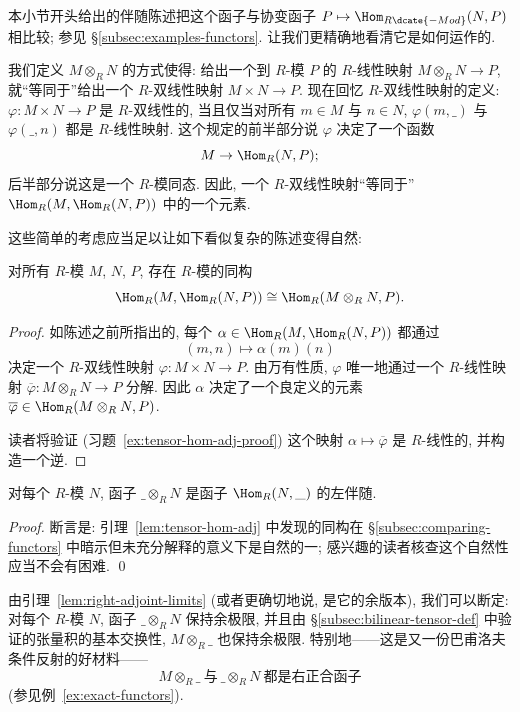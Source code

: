 本小节开头给出的伴随陈述把这个函子与协变函子 $P\mapsto\Hom_{R\dcate{-Mod}}(N,P)$ 相比较; 参见 §\ref{subsec:examples-functors}. 让我们更精确地看清它是如何运作的.

我们定义 $M\otimes_R N$ 的方式使得: 给出一个到 $R$-模 $P$ 的 $R$-线性映射 $M\otimes_R N\to P$, 就``等同于''给出一个 $R$-双线性映射 $M\times N\to P$. 现在回忆 $R$-双线性映射的定义: $\varphi:M\times N\to P$ 是 $R$-双线性的, 当且仅当对所有 $m\in M$ 与 $n\in N$, $\varphi(m,\_)$ 与 $\varphi(\_,n)$ 都是 $R$-线性映射. 这个规定的前半部分说 $\varphi$ 决定了一个函数
\[
M\to\Hom_R(N,P);
\]
后半部分说这是一个 $R$-模同态. 因此, 一个 $R$-双线性映射``等同于''$\Hom_R(M,\Hom_R(N,P))$ 中的一个元素.

这些简单的考虑应当足以让如下看似复杂的陈述变得自然:

\begin{lemma}\label{lem:tensor-hom-adj}
对所有 $R$-模 $M$, $N$, $P$, 存在 $R$-模的同构
\[
\Hom_R(M,\Hom_R(N,P))\cong\Hom_R(M\otimes_R N,P).
\]
\end{lemma}

\begin{proof}
如陈述之前所指出的, 每个 $\alpha\in\Hom_R(M,\Hom_R(N,P))$ 都通过
\[
(m,n)\mapsto\alpha(m)(n)
\]
决定一个 $R$-双线性映射 $\varphi:M\times N\to P$. 由万有性质, $\varphi$ 唯一地通过一个 $R$-线性映射 $\overline{\varphi}:M\otimes_R N\to P$ 分解. 因此 $\alpha$ 决定了一个良定义的元素 $\overline{\varphi}\in\Hom_R(M\otimes_R N,P)$.

读者将验证 (习题~\ref{ex:tensor-hom-adj-proof}) 这个映射 $\alpha\mapsto\overline{\varphi}$ 是 $R$-线性的, 并构造一个逆.
\end{proof}

\begin{corollary}\label{cor:tensor-left-adjoint}
对每个 $R$-模 $N$, 函子 $\_\otimes_R N$ 是函子 $\Hom_R(N,\_)$ 的左伴随.
\end{corollary}

\begin{proof}
断言是: 引理~\ref{lem:tensor-hom-adj} 中发现的同构在 §\ref{subsec:comparing-functors} 中暗示但未充分解释的意义下是自然的一; 感兴趣的读者核查这个自然性应当不会有困难. \qed
\end{proof}

由引理~\ref{lem:right-adjoint-limits} (或者更确切地说, 是它的余版本), 我们可以断定: 对每个 $R$-模 $N$, 函子 $\_\otimes_R N$ 保持余极限, 并且由 §\ref{subsec:bilinear-tensor-def} 中验证的张量积的基本交换性, $M\otimes_R\_$ 也保持余极限. 特别地——这是又一份巴甫洛夫条件反射的好材料——
\[
M\otimes_R\_\ \text{与}\ \_\otimes_R N\ \text{都是右正合函子}
\]
(参见例~\ref{ex:exact-functors}).

